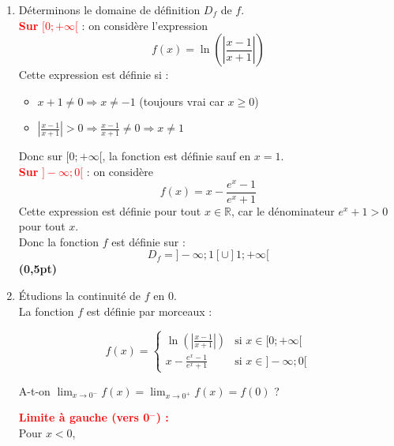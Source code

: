 \documentclass[12pt,a4paper]{article}
\begin{document}
\begin{enumerate}
    \item Déterminons le domaine de définition \( D_f \) de \( f \).\\

          \textcolor{red}{\textbf{Sur } \( [0 ; +\infty[ \)} : on considère l’expression
          \[
              f(x) = \ln\left( \left| \frac{x - 1}{x + 1} \right| \right)
          \]
          Cette expression est définie si :
          \begin{itemize}
              \item \( x + 1 \neq 0 \Rightarrow x \neq -1 \) (toujours vrai car \( x \geq 0 \))
              \item \( \left| \frac{x - 1}{x + 1} \right| > 0 \Rightarrow \frac{x - 1}{x + 1} \neq 0 \Rightarrow x \neq 1 \)
          \end{itemize}
          Donc sur \( [0 ; +\infty[ \), la fonction est définie sauf en \( x = 1 \).\\

          \textcolor{red}{\textbf{Sur } \( ]-\infty ; 0[ \)} : on considère
                  \[
                      f(x) = x-\frac{e^x - 1}{e^x + 1}
                  \]
                  Cette expression est définie pour tout \( x \in \mathbb{R} \), car le dénominateur \( e^x + 1 > 0 \) pour tout \( x \).\\

                  Donc la fonction \( f \) est définie sur :
                  \[
                  D_f = ]-\infty ; 1[ \cup ]1 ; +\infty[
          \]
          \hfill \textbf{(0,5pt)}

    \item Étudions la continuité de \( f \) en 0.\\

        La fonction \( f \) est définie par morceaux :

        \[
            f(x) =
            \begin{cases}
                \ln\left( \left| \frac{x - 1}{x + 1} \right| \right) & \text{si } x \in [0 ; +\infty[ \\
                x-\frac{e^x - 1}{e^x + 1}                            & \text{si } x \in ]-\infty ; 0[
            \end{cases}
        \]

        A-t-on \( \displaystyle \lim_{x \to 0^-} f(x) = \lim_{x \to 0^+} f(x) = f(0) \) ?

        \textcolor{red}{\textbf{Limite à gauche (vers 0\(^-\)) :}}\\
        Pour \( x < 0 \),


\end{enumerate}
\end{document}
